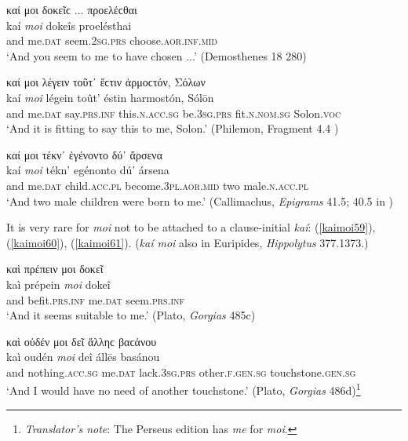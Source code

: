 \begin{exe}
\ex καί μοι δοκεῖϲ ... προελέϲθαι\\
\gll kaí \emph{moi} dokeîs proelésthai\\
and me.\textsc{dat} seem.\textsc{2sg.prs} choose.\textsc{aor.inf.mid}\\
\trans `And you seem to me to have chosen ...' (Demosthenes 18 280)
\label{kaimoi56}
\end{exe}

\begin{exe}
\ex καί μοι λέγειν τοῦτ᾽ ἔϲτιν ἁρμοϲτόν, Σόλων\\
\gll kaí \emph{moi} légein toût' éstin harmostón, Sólōn\\
and me.\textsc{dat} say.\textsc{prs.inf} this.\textsc{n.acc.sg}
be.\textsc{3sg.prs} fit.\textsc{n.nom.sg} Solon.\textsc{voc}\\
\trans `And it is fitting to say this to me, Solon.' (Philemon, Fragment 4.4 \citep[479]{Kock1884})
\label{kaimoi57}
\end{exe}

\begin{exe}
\ex καί μοι τέκν᾽ ἐγένοντο δύ᾽ ἄρσενα\\
\gll kaí \emph{moi} tékn' egénonto dú' ársena\\
and me.\textsc{dat} child.\textsc{acc.pl} become.\textsc{3pl.aor.mid} two male.\textsc{n.acc.pl}\\
\trans `And two male children were born to me.' (Callimachus, \textit{Epigrams} 41.5; 40.5 in \citealp{Wilamowitz1882})
\label{kaimoi58}
\end{exe}

It is very rare for \textit{moi} not to be attached to a clause-initial \textit{kaí}: (\ref{kaimoi59}), (\ref{kaimoi60}), (\ref{kaimoi61}). (\textit{kaí moi} also in Euripides, \textit{Hippolytus} 377.1373.)

\begin{exe}
\ex καὶ πρέπειν μοι δοκεῖ\\
\gll kaì prépein \emph{moi} dokeî\\
and befit.\textsc{prs.inf} me.\textsc{dat} seem.\textsc{prs.inf}\\
\trans `And it seems suitable to me.' (Plato, \textit{Gorgias} 485c)
\label{kaimoi59}
\end{exe}

\begin{exe}
\ex καὶ οὐδέν μοι δεῖ ἄλληϲ βαϲάνου\\
\gll kaì oudén \emph{moi} deî állēs basánou\\
and nothing.\textsc{acc.sg} me.\textsc{dat} lack.\textsc{3sg.prs}
other.\textsc{f.gen.sg} touchstone.\textsc{gen.sg}\\
\trans `And I would have no need of another touchstone.' (Plato, \textit{Gorgias} 486d)\footnote{\emph{Translator's note}: The Perseus edition has  \textit{me} for \textit{moi}.}
\label{kaimoi60}
\end{exe}

